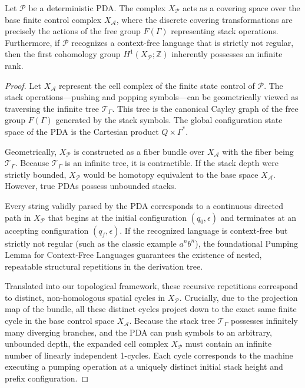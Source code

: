 \begin{theorem}
Let $\mathcal{P}$ be a deterministic PDA. The complex $X_\mathcal{P}$ acts as a covering space over the base finite control complex $X_\mathcal{A}$, where the discrete covering transformations are precisely the actions of the free group $F(\Gamma)$ representing stack operations. Furthermore, if $\mathcal{P}$ recognizes a context-free language that is strictly not regular, then the first cohomology group $H^1(X_\mathcal{P}; \mathbb{Z})$ inherently possesses an infinite rank.
\end{theorem}
\begin{proof}
Let $X_\mathcal{A}$ represent the cell complex of the finite state control of $\mathcal{P}$. The stack operations—pushing and popping symbols—can be geometrically viewed as traversing the infinite tree $\mathcal{T}_\Gamma$. This tree is the canonical Cayley graph of the free group $F(\Gamma)$ generated by the stack symbols. The global configuration state space of the PDA is the Cartesian product $Q \times \Gamma^*$.

Geometrically, $X_\mathcal{P}$ is constructed as a fiber bundle over $X_\mathcal{A}$ with the fiber being $\mathcal{T}_\Gamma$. Because $\mathcal{T}_\Gamma$ is an infinite tree, it is contractible. If the stack depth were strictly bounded, $X_\mathcal{P}$ would be homotopy equivalent to the base space $X_\mathcal{A}$. However, true PDAs possess unbounded stacks.

Every string validly parsed by the PDA corresponds to a continuous directed path in $X_\mathcal{P}$ that begins at the initial configuration $(q_0, \epsilon)$ and terminates at an accepting configuration $(q_f, \epsilon)$.
If the recognized language is context-free but strictly not regular (such as the classic example $a^n b^n$), the foundational Pumping Lemma for Context-Free Languages guarantees the existence of nested, repeatable structural repetitions in the derivation tree. 

Translated into our topological framework, these recursive repetitions correspond to distinct, non-homologous spatial cycles in $X_\mathcal{P}$. Crucially, due to the projection map of the bundle, all these distinct cycles project down to the exact same finite cycle in the base control space $X_\mathcal{A}$. 
Because the stack tree $\mathcal{T}_\Gamma$ possesses infinitely many diverging branches, and the PDA can push symbols to an arbitrary, unbounded depth, the expanded cell complex $X_\mathcal{P}$ must contain an infinite number of linearly independent 1-cycles. Each cycle corresponds to the machine executing a pumping operation at a uniquely distinct initial stack height and prefix configuration.


\end{proof}
